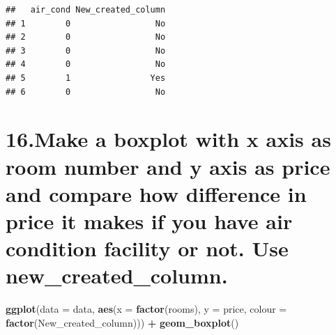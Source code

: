 \documentclass[]{article}
\newenvironment{Shaded}{\begin{snugshade}}{\end{snugshade}}
\newcommand{\DataTypeTok}[1]{\textcolor[rgb]{0.13,0.29,0.53}{#1}}
\newcommand{\DecValTok}[1]{\textcolor[rgb]{0.00,0.00,0.81}{#1}}
\newcommand{\KeywordTok}[1]{\textcolor[rgb]{0.13,0.29,0.53}{\textbf{#1}}}
\newcommand{\NormalTok}[1]{#1}
\newcommand{\OperatorTok}[1]{\textcolor[rgb]{0.81,0.36,0.00}{\textbf{#1}}}
\newcommand{\OtherTok}[1]{\textcolor[rgb]{0.56,0.35,0.01}{#1}}
\newcommand{\StringTok}[1]{\textcolor[rgb]{0.31,0.60,0.02}{#1}}
\begin{document}
\begin{Shaded}
\end{Shaded}

\begin{verbatim}
##   air_cond New_created_column
## 1        0                 No
## 2        0                 No
## 3        0                 No
## 4        0                 No
## 5        1                Yes
## 6        0                 No
\end{verbatim}

\hypertarget{make-a-boxplot-with-x-axis-as-room-number-and-y-axis-as-price-and-compare-how-difference-in-price-it-makes-if-you-have-air-condition-facility-or-not.-use-new_created_column.}{%
\section{16.Make a boxplot with x axis as room number and y axis as
price and compare how difference in price it makes if you have air
condition facility or not. Use
new\_created\_column.}\label{make-a-boxplot-with-x-axis-as-room-number-and-y-axis-as-price-and-compare-how-difference-in-price-it-makes-if-you-have-air-condition-facility-or-not.-use-new_created_column.}}

\begin{Shaded}
\begin{Highlighting}[]
\KeywordTok{ggplot}\NormalTok{(}\DataTypeTok{data =}\NormalTok{ data, }\KeywordTok{aes}\NormalTok{(}\DataTypeTok{x =} \KeywordTok{factor}\NormalTok{(rooms), }
                        \DataTypeTok{y =}\NormalTok{ price, }
                        \DataTypeTok{colour =} \KeywordTok{factor}\NormalTok{(New_created_column))) }\OperatorTok{+}
\StringTok{  }\KeywordTok{geom_boxplot}\NormalTok{()}
\end{Highlighting}
\end{Shaded}
\end{document}
